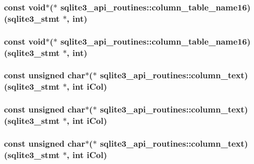 \subsubsection{\setlength{\rightskip}{0pt plus 5cm}const void$\ast$($\ast$ \bf{sqlite3\_\-api\_\-routines::column\_\-table\_\-name16})(\bf{sqlite3\_\-stmt} $\ast$, int)}\label{structsqlite3__api__routines_db29e0bc24a7cd6618e7f2812cb6cbd9}


\subsubsection{\setlength{\rightskip}{0pt plus 5cm}const void$\ast$($\ast$ \bf{sqlite3\_\-api\_\-routines::column\_\-table\_\-name16})(\bf{sqlite3\_\-stmt} $\ast$, int)}\label{structsqlite3__api__routines_db29e0bc24a7cd6618e7f2812cb6cbd9}


\subsubsection{\setlength{\rightskip}{0pt plus 5cm}const unsigned char$\ast$($\ast$ \bf{sqlite3\_\-api\_\-routines::column\_\-text})(\bf{sqlite3\_\-stmt} $\ast$, int i\-Col)}\label{structsqlite3__api__routines_490ab1473404c6456a8aff4ff4b61224}


\subsubsection{\setlength{\rightskip}{0pt plus 5cm}const unsigned char$\ast$($\ast$ \bf{sqlite3\_\-api\_\-routines::column\_\-text})(\bf{sqlite3\_\-stmt} $\ast$, int i\-Col)}\label{structsqlite3__api__routines_490ab1473404c6456a8aff4ff4b61224}


\subsubsection{\setlength{\rightskip}{0pt plus 5cm}const unsigned char$\ast$($\ast$ \bf{sqlite3\_\-api\_\-routines::column\_\-text})(\bf{sqlite3\_\-stmt} $\ast$, int i\-Col)}\label{structsqlite3__api__routines_490ab1473404c6456a8aff4ff4b61224}


